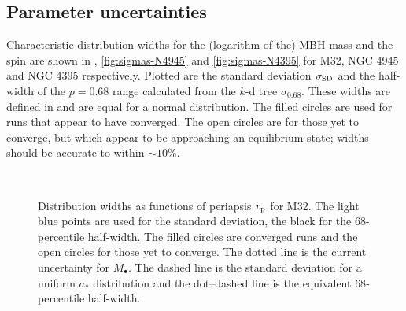 \subsection{Parameter uncertainties}

Characteristic distribution widths for the (logarithm of the) MBH mass and the spin are shown in , \ref{fig:sigmas-N4945} and \ref{fig:sigmas-N4395} for M32, NGC 4945 and NGC 4395 respectively. Plotted are the standard deviation $\sigma_\mathrm{SD}$ and the half-width of the $p = 0.68$ range calculated from the $k$-d tree $\sigma_{0.68}$. These widths are defined in  and are equal for a normal distribution. The filled circles are used for runs that appear to have converged. The open circles are for those yet to converge, but which appear to be approaching an equilibrium state; widths should be accurate to within $\sim 10\%$.
\begin{figure}
\centering
{} \quad
{} \\
\caption{Distribution widths as functions of periapsis $r_\mathrm{p}$ for M32. The light blue points are used for the standard deviation, the black for the $68$-percentile half-width. The filled circles are converged runs and the open circles for those yet to converge. The dotted line is the current uncertainty for $M_\bullet$. The dashed line is the standard deviation for a uniform $a_\ast$ distribution and the dot--dashed line is the equivalent $68$-percentile half-width.}
\label{fig:sigmas-M32}
\end{figure}
